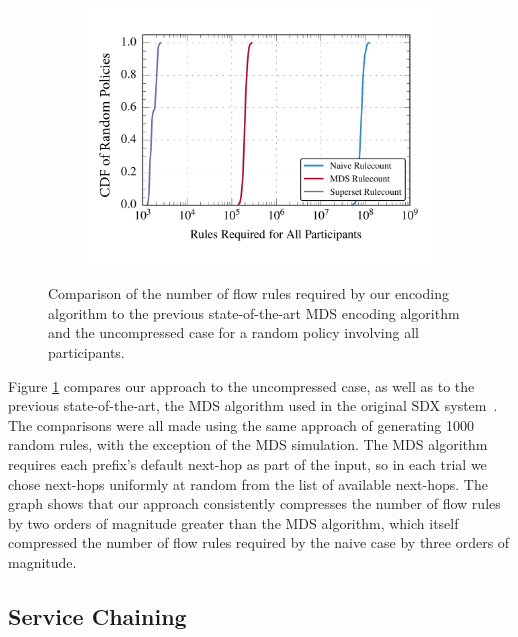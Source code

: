 \begin{figure}[t!] 
\begin{minipage}{1\linewidth}
\begin{subfigure}[b]{0.96\linewidth}
\includegraphics[width=\linewidth]{figures/comparison_cdf}
\end{subfigure} 
\end{minipage} 
\caption{Comparison of the number of flow rules required by our encoding algorithm to the previous state-of-the-art MDS encoding algorithm and the uncompressed case for a random policy involving all participants.}
\label{fig:comparison}
\end{figure}


Figure \ref{fig:comparison} compares our approach to the uncompressed case, as well as to the previous state-of-the-art, the MDS algorithm used in the original SDX system~\cite{sdx}. The comparisons were all made using the same approach of generating 1000 random rules, with the exception of the MDS simulation. The MDS algorithm requires each prefix's default next-hop as part of the input, so in each trial we chose next-hops uniformly at random from the list of available next-hops. The graph shows that our approach consistently compresses the number of flow rules by two orders of magnitude greater than the MDS algorithm, which itself compressed the number of flow rules required by the naive case by three orders of magnitude. 



\subsection{Service Chaining}

